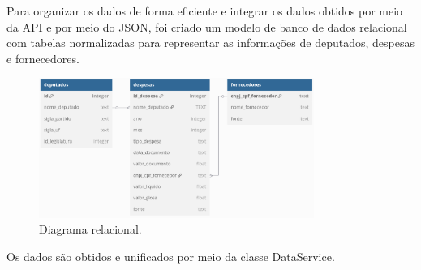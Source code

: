 \documentclass[12pt, a4paper]{article}
\begin{document}
Para organizar os dados de forma eficiente e integrar os dados obtidos por meio da API e por meio do JSON, foi criado um modelo de banco de dados relacional com tabelas normalizadas para representar as informações de deputados, despesas e fornecedores\cite{dbdiagram}.

\begin{figure}[!htbp]
	\centering
	\includegraphics[width=0.8\textwidth]{assets/1_dbdiagram.png}
	\caption{Diagrama relacional.}
	\label{fig:arquivo_json}
\end{figure}

Os dados são obtidos e unificados por meio da classe DataService.
\end{document}
